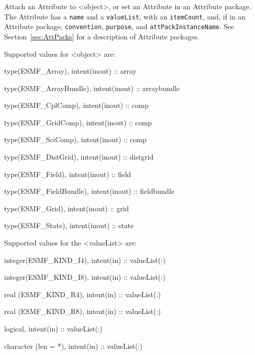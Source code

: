    Attach an Attribute to <object>, or set an Attribute in an
   Attribute package. The Attribute has a {\tt name} and a
   {\tt valueList}, with an {\tt itemCount}, and, if in an Attribute
   package, {\tt convention}, {\tt purpose}, and {\tt attPackInstanceName}.
   See Section~\ref{sec:AttPacks} for a
   description of Attribute packages.
  
   Supported values for <object> are:
   \begin{description}
   \item type(ESMF\_Array), intent(inout) :: array
   \item type(ESMF\_ArrayBundle), intent(inout) :: arraybundle
   \item type(ESMF\_CplComp), intent(inout) :: comp
   \item type(ESMF\_GridComp), intent(inout) :: comp
   \item type(ESMF\_SciComp), intent(inout) :: comp
   \item type(ESMF\_DistGrid), intent(inout) :: distgrid
   \item type(ESMF\_Field), intent(inout) :: field
   \item type(ESMF\_FieldBundle), intent(inout) :: fieldbundle
   \item type(ESMF\_Grid), intent(inout) :: grid
   \item type(ESMF\_State), intent(inout) :: state
   \end{description}
  
   Supported values for the <valueList> are:
   \begin{description}
   \item integer(ESMF\_KIND\_I4), intent(in) :: valueList(:)
   \item integer(ESMF\_KIND\_I8), intent(in) :: valueList(:)
   \item real (ESMF\_KIND\_R4), intent(in) :: valueList(:)
   \item real (ESMF\_KIND\_R8), intent(in) :: valueList(:)
   \item logical, intent(in) :: valueList(:)
   \item character (len = *), intent(in) :: valueList(:)
   \end{description}
  
